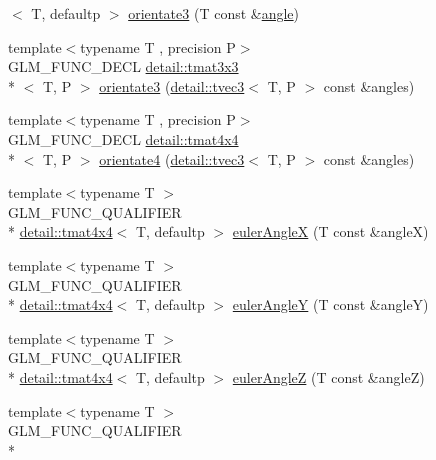 \begin{DoxyCompactItemize}
$<$ T, defaultp $>$ \hyperlink{group__gtx__euler__angles_ga2c94907d441c40beb413fe3284c1b267}{orientate3} (T const \&\hyperlink{group__gtc__quaternion_ga23a3fc7ada5bbb665ff84c92c6e0542c}{angle})
\item 
{\footnotesize template$<$typename T , precision P$>$ }\\G\-L\-M\-\_\-\-F\-U\-N\-C\-\_\-\-D\-E\-C\-L \hyperlink{structglm_1_1detail_1_1tmat3x3}{detail\-::tmat3x3}\\*
$<$ T, P $>$ \hyperlink{group__gtx__euler__angles_gab6a2a986916647ddedc94bbd2516f20c}{orientate3} (\hyperlink{structglm_1_1detail_1_1tvec3}{detail\-::tvec3}$<$ T, P $>$ const \&angles)
\item 
{\footnotesize template$<$typename T , precision P$>$ }\\G\-L\-M\-\_\-\-F\-U\-N\-C\-\_\-\-D\-E\-C\-L \hyperlink{structglm_1_1detail_1_1tmat4x4}{detail\-::tmat4x4}\\*
$<$ T, P $>$ \hyperlink{group__gtx__euler__angles_ga3b9f62da9726cdad708df41712792082}{orientate4} (\hyperlink{structglm_1_1detail_1_1tvec3}{detail\-::tvec3}$<$ T, P $>$ const \&angles)
\item 
{\footnotesize template$<$typename T $>$ }\\G\-L\-M\-\_\-\-F\-U\-N\-C\-\_\-\-Q\-U\-A\-L\-I\-F\-I\-E\-R \\*
\hyperlink{structglm_1_1detail_1_1tmat4x4}{detail\-::tmat4x4}$<$ T, defaultp $>$ \hyperlink{group__gtx__euler__angles_ga97994e53d856ae89ed2622d66ab86c2c}{euler\-Angle\-X} (T const \&angle\-X)
\item 
{\footnotesize template$<$typename T $>$ }\\G\-L\-M\-\_\-\-F\-U\-N\-C\-\_\-\-Q\-U\-A\-L\-I\-F\-I\-E\-R \\*
\hyperlink{structglm_1_1detail_1_1tmat4x4}{detail\-::tmat4x4}$<$ T, defaultp $>$ \hyperlink{group__gtx__euler__angles_gacdc188a23a928d57d4490ff7d646fb96}{euler\-Angle\-Y} (T const \&angle\-Y)
\item 
{\footnotesize template$<$typename T $>$ }\\G\-L\-M\-\_\-\-F\-U\-N\-C\-\_\-\-Q\-U\-A\-L\-I\-F\-I\-E\-R \\*
\hyperlink{structglm_1_1detail_1_1tmat4x4}{detail\-::tmat4x4}$<$ T, defaultp $>$ \hyperlink{group__gtx__euler__angles_gaf55b28c29ebd7ba728f1ad6490c89687}{euler\-Angle\-Z} (T const \&angle\-Z)
\item 
{\footnotesize template$<$typename T $>$ }\\G\-L\-M\-\_\-\-F\-U\-N\-C\-\_\-\-Q\-U\-A\-L\-I\-F\-I\-E\-R \\*

\end{DoxyCompactItemize}

